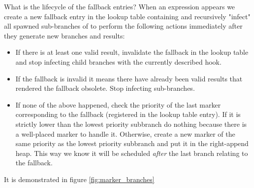 What is the lifecycle of the fallback entries? When an expression
 appears we create a new fallback entry in the lookup
table containing  and recursively "infect" all spawned
sub-branches of  to perform the following actions immediately
after they generate new branches and results:

\begin{itemize}
\item If there is at least one valid result, invalidate the fallback in
  the lookup table and stop infecting child branches with the
  currently described hook.
\item If the fallback is invalid it means there have already been
  valid results that rendered the fallback obsolete. Stop infecting
  sub-branches.
\item If none of the above happened, check the priority of the last marker
  corresponding to the fallback (registered in the lookup table
  entry). If it is strictly lower than the lowest priority subbranch
  do nothing because there is a well-placed marker to handle
  it. Otherwise, create a new marker of the same priority as the lowest
  priority subbranch and put it in the right-append heap. This way we
  know it will be scheduled \emph{after} the last branch relating to the
  fallback.
\end{itemize}


It is demonstrated in figure \ref{fig:marker_branches}

